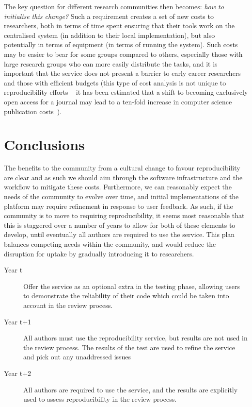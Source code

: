\documentclass[conference]{IEEEtran}
\begin{document}
The key question for different research communities then becomes:
{\emph{how to initialise this change?}} Such a requirement creates a
set of new costs to researchers, both in terms of time spent ensuring
that their tools work on the centralised system (in addition to their
local implementation), but also potentially in terms of equipment (in
terms of running the system). Such costs may be easier to bear for
some groups compared to others, especially those with large research
groups who can more easily distribute the tasks, and it is important
that the service does not present a barrier to early career
researchers and those with efficient budgets (this type of cost
analysis is not unique to reproducibility efforts -- it has been
estimated that a shift to becoming exclusively open access for a
journal may lead to a ten-fold increase in computer science
publication costs~\cite{vardi-cacm-2014}).


\section{Conclusions}\label{concl}

The benefits to the community from a cultural change to favour
reproducibility are clear and as such we should aim through the
software infrastructure and the workflow to mitigate these
costs. Furthermore, we can reasonably expect the needs of the
community to evolve over time, and initial implementations of the
platform may require refinement in response to user feedback. As such,
if the community is to move to requiring reproducibility, it seems
most reasonable that this is staggered over a number of years to allow
for both of these elements to develop, until eventually all authors
are required to use the service. This plan balances competing needs
within the community, and would reduce the disruption for uptake by
gradually introducing it to researchers.

\begin{description}
\item[Year t] Offer the service as an optional extra in the
  testing phase, allowing users to demonstrate the reliability of
  their code which could be taken into account in the review process.
\item[Year t+1] All authors must use the reproducibility
  service, but results are not used in the review process. The results
  of the test are used to refine the service and pick out any
  unaddressed issues
\item[Year t+2] All authors are required to use the service, and
  the results are explicitly used to assess reproducibility in the
  review process.
\end{description}
\end{document}
